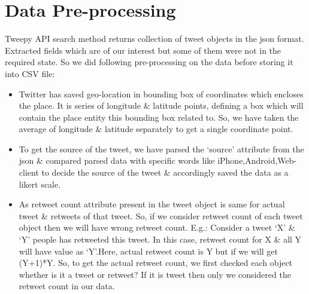 \documentclass[journal, a4paper]{IEEEtran}
\begin{document}
\section{Data Pre-processing}
	Tweepy API search method returns collection of tweet objects in the json format.\\Extracted fields which are of our interest but some of them were not in the required state. So we did following pre-processing on the data before storing it into CSV file:\\
   \begin{itemize}
  \item Twitter has saved geo-location in bounding box of coordinates which encloses the place. It is series of longitude \& latitude points, defining a box which will contain the place entity this bounding box related to. So, we have taken the average of longitude \& latitude separately to get a single coordinate point.
  \item To get the source of the tweet, we have parsed the ‘source’ attribute from the json \& compared parsed data with specific words like iPhone,Android,Web-client to decide the source of the tweet \& accordingly saved the data as a likert scale.
  \item As retweet count attribute present in the tweet object is same for actual tweet \& retweets of that tweet. So, if we consider retweet count of each tweet object then we will have wrong retweet count. E.g.: Consider a tweet ‘X’ \& ‘Y’ people has retweeted this tweet. In this case, retweet count for X \& all Y will have value as ‘Y’.Here, actual retweet count is Y but if we will get (Y+1)*Y. So, to get the actual retweet count, we first checked each object whether is it a tweet or retweet? If it is tweet then only we considered the retweet count in our data.
\end{itemize}
\end{document}
